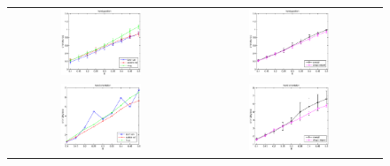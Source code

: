 
\begin{figure}[htbp]
  \begin{center}
    \begin{tabular}{cc}
      \includegraphics[width=0.45\textwidth]{error_pos.eps} &
      \includegraphics[width=0.45\textwidth]{error_cmp_pos.eps} \\
      \includegraphics[width=0.45\textwidth]{error_ori.eps} &
      \includegraphics[width=0.45\textwidth]{error_cmp_ori.eps} \\

\end{tabular}
\end{center}
\end{figure}
